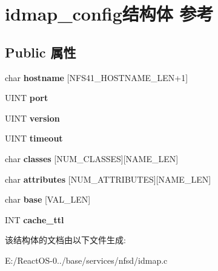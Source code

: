 \hypertarget{structidmap__config}{}\section{idmap\+\_\+config结构体 参考}
\label{structidmap__config}
\subsection*{Public 属性}
\begin{DoxyCompactItemize}
\item 
\mbox{\label{structidmap__config_afc292613f3bbf19e3a0d8758549fd033}} 
char {\bfseries hostname} \mbox{[}N\+F\+S41\+\_\+\+H\+O\+S\+T\+N\+A\+M\+E\+\_\+\+L\+EN+1\mbox{]}
\item 
\mbox{\label{structidmap__config_a92465d4895f5b0a2abd25c6f8e8bfdc9}} 
U\+I\+NT {\bfseries port}
\item 
\mbox{\label{structidmap__config_a9b4b99706623b766006b2cf35dab5f17}} 
U\+I\+NT {\bfseries version}
\item 
\mbox{\label{structidmap__config_a0efd700125c6fac826d404f18bafed88}} 
U\+I\+NT {\bfseries timeout}
\item 
\mbox{\label{structidmap__config_a4457ef31d1334158495da194228a7c3d}} 
char {\bfseries classes} \mbox{[}N\+U\+M\+\_\+\+C\+L\+A\+S\+S\+ES\mbox{]}\mbox{[}N\+A\+M\+E\+\_\+\+L\+EN\mbox{]}
\item 
\mbox{\label{structidmap__config_ae19b3cc5c91beefc829e426199f22d1a}} 
char {\bfseries attributes} \mbox{[}N\+U\+M\+\_\+\+A\+T\+T\+R\+I\+B\+U\+T\+ES\mbox{]}\mbox{[}N\+A\+M\+E\+\_\+\+L\+EN\mbox{]}
\item 
\mbox{\label{structidmap__config_a2419d1252460fc522f010abb8994408c}} 
char {\bfseries base} \mbox{[}V\+A\+L\+\_\+\+L\+EN\mbox{]}
\item 
\mbox{\label{structidmap__config_abc3d8f5052fc767e1aa5d62c8da9571e}} 
I\+NT {\bfseries cache\+\_\+ttl}
\end{DoxyCompactItemize}


该结构体的文档由以下文件生成\+:\begin{DoxyCompactItemize}
\item 
E\+:/\+React\+O\+S-\/0../base/services/nfsd/idmap.\+c\end{DoxyCompactItemize}
